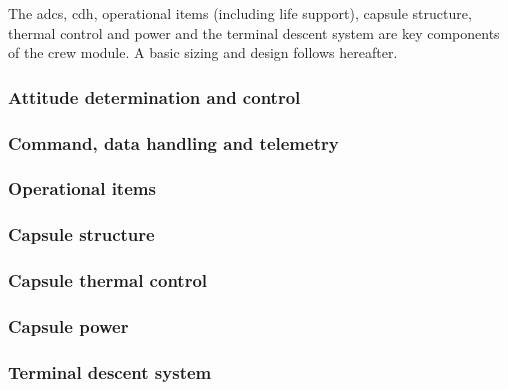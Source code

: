 The \acrfull{adcs}, \acrfull{cdh}, operational items (including life support), capsule structure, thermal control and power and the terminal descent system are key components of the crew module. A basic sizing and design follows hereafter.

\subsubsection{Attitude determination and control} \label{subsec:adcs}


\subsubsection{Command, data handling and telemetry} \label{subsec:cdh}


\subsubsection{Operational items} \label{subsec:crewop}


\subsubsection{Capsule structure} \label{subsec:crewstruc}


\subsubsection{Capsule thermal control} \label{subsec:crewthermalcontrol}


\subsubsection{Capsule power} \label{subsec:pwer}


\subsubsection{Terminal descent system} \label{subsec:crewtermdescent}





